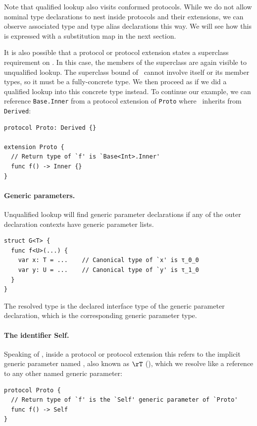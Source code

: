 \documentclass[../generics]{subfiles}
\begin{document}
Note that qualified lookup also visits conformed protocols. While we do not allow nominal type declarations to nest inside protocols and their extensions, we can observe associated type and type alias declarations this way. We will see how this is expressed with a substitution map in the next section.

It is also possible that a protocol or protocol extension states a superclass requirement on \tSelf. In this case, the members of the superclass are again visible to unqualified lookup. The superclass bound of \tSelf\ cannot involve itself or its member types, so it must be a fully-concrete type. We then proceed as if we did a qualified lookup into this concrete type instead. To continue our example, we can reference \texttt{Base.Inner} from a protocol extension of \texttt{Proto} where \tSelf\ inherits from \texttt{Derived}:
\begin{Verbatim}
protocol Proto: Derived {}

extension Proto {
  // Return type of `f' is `Base<Int>.Inner'
  func f() -> Inner {}
}
\end{Verbatim}

\paragraph{Generic parameters.}
Unqualified lookup will find generic parameter declarations if any of the outer declaration contexts have generic parameter lists.
\begin{Verbatim}
struct G<T> {
  func f<U>(...) {
    var x: T = ...    // Canonical type of `x' is τ_0_0
    var y: U = ...    // Canonical type of `y' is τ_1_0
  }
}
\end{Verbatim}
The resolved type is the declared interface type of the generic parameter declaration, which is the corresponding generic parameter type.

\paragraph{The identifier Self.}
Speaking of \tSelf, inside a protocol or protocol extension this refers to the \IndexSelf implicit generic parameter named \tSelf, also known as $\rT$ (), which we resolve like a reference to any other named generic parameter:
\begin{Verbatim}
protocol Proto {
  // Return type of `f' is the `Self' generic parameter of `Proto'
  func f() -> Self
}
\end{Verbatim}
\end{document}
